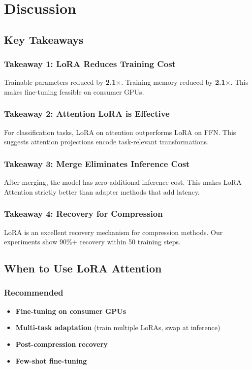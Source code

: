 \section{Discussion}

\subsection{Key Takeaways}

\subsubsection{Takeaway 1: LoRA Reduces Training Cost}

Trainable parameters reduced by \textbf{2.1$\times$}. Training memory 
reduced by \textbf{2.1$\times$}. This makes fine-tuning feasible on consumer 
GPUs.

\subsubsection{Takeaway 2: Attention LoRA is Effective}

For classification tasks, LoRA on attention outperforms LoRA on FFN. This 
suggests attention projections encode task-relevant transformations.

\subsubsection{Takeaway 3: Merge Eliminates Inference Cost}

After merging, the model has zero additional inference cost. This makes 
LoRA Attention strictly better than adapter methods that add latency.

\subsubsection{Takeaway 4: Recovery for Compression}

LoRA is an excellent recovery mechanism for compression methods. Our 
experiments show 90\%+ recovery within 50 training steps.

\subsection{When to Use LoRA Attention}

\subsubsection{Recommended}
\begin{itemize}
\item \textbf{Fine-tuning on consumer GPUs}
\item \textbf{Multi-task adaptation} (train multiple LoRAs, swap at inference)
\item \textbf{Post-compression recovery}
\item \textbf{Few-shot fine-tuning}

\end{itemize}
